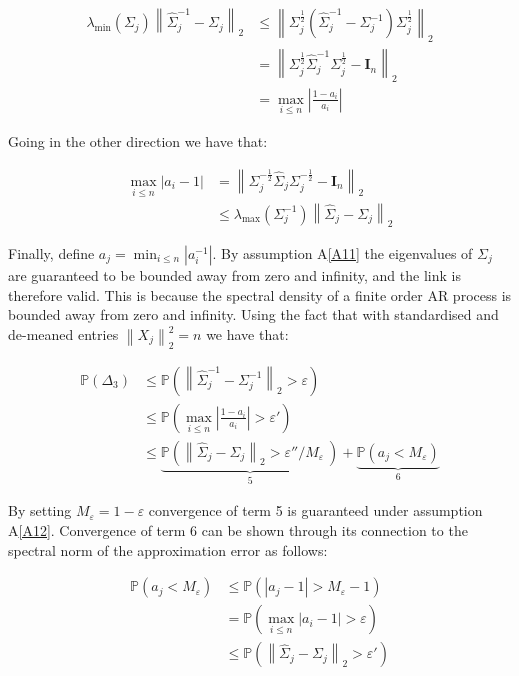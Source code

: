 \documentclass[11pt]{report}\usepackage[utf8]{inputenc}
\begin{document}
\begin{align*}
    \lambda_{\min}\left ( \Sigma_j \right ) \left \| \widehat{\Sigma}_j^{-1} - \Sigma_j\right \|_2 & \leq \left \| \Sigma_j^{\frac{1}{2}}\left ( \widehat{\Sigma}_j^{-1} - \Sigma_j^{-1} \right )\Sigma_j^{\frac{1}{2}} \right \|_2 \\ 
    & = \left \| \Sigma_j^{\frac{1}{2}}\widehat{\Sigma}_j^{-1}\Sigma_j^{\frac{1}{2}} - \mathbf{I}_n \right \|_2 \\
    & = \max_{i \leq n}\left | \frac{1-a_i}{a_i} \right |
\end{align*}

Going in the other direction we have that: 

\begin{align*}
    \max_{i \leq n}\left | a_i - 1 \right | & = \left \| \Sigma_j^{-\frac{1}{2}} \widehat{\Sigma}_j \Sigma_j^{-\frac{1}{2}} - \mathbf{I}_n \right \|_2 \\
    & \leq \lambda_{\max} (\Sigma_j^{-1} )\left \| \widehat{\Sigma}_j - \Sigma_j \right \|_2
\end{align*}

Finally, define $a_j = \min_{i \leq n} \left | a_i^{-1} \right |$. By assumption A\ref{A11} the eigenvalues of $\Sigma_j$ are guaranteed to be bounded away from zero and infinity, and the link is therefore valid. This is because the spectral density of a finite order AR process is bounded away from zero and infinity. Using the fact that with standardised and de-meaned entries $\left \| X_j \right \|_2^2 = n$ we have that: 

\begin{align*}
    \mathbb{P}\left ( \Delta_3 \right ) & \leq \mathbb{P}\left ( \left \| \widehat{\Sigma}_j^{-1} - \Sigma_j^{-1} \right \|_2 > \varepsilon \right ) \\
    & \leq \mathbb{P}\left ( \max_{i \leq n}\left | \frac{1-a_i}{a_i} \right | > \varepsilon' \right ) \\
    & \leq \underbrace{\mathbb{P}\left ( \left \| \widehat{\Sigma}_j - \Sigma_j \right \|_2 > \varepsilon''/M_\varepsilon \ \right )}_5 + \underbrace{\mathbb{P}\left ( a_j < M_\varepsilon \right )}_6
\end{align*}

By setting $M_\varepsilon = 1 - \varepsilon$ convergence of term 5 is guaranteed under assumption A\ref{A12}. Convergence of term 6 can be shown through its connection to the spectral norm of the approximation error as follows:  

\begin{align*}
    \mathbb{P}\left ( a_j < M_\varepsilon \right ) & \leq \mathbb{P}\left ( \left | a_j -1  \right | > M_\varepsilon - 1 \right ) \\ 
    & = \mathbb{P}\left ( \max_{i \leq n}\left | a_i -1 \right | > \varepsilon \right ) \\
    & \leq \mathbb{P}\left ( \left \| \widehat{\Sigma}_j - \Sigma_j \right \|_2 > \varepsilon '\right )
\end{align*}
\end{document}
